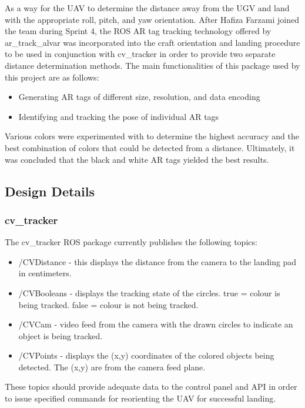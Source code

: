 As a way for the UAV to determine the distance away from the UGV and land with the appropriate roll, pitch, and yaw orientation. After Hafiza Farzami joined the team during Sprint 4, the ROS AR tag tracking technology offered by ar\_track\_alvar was incorporated into the craft orientation and landing procedure to be used in conjunction with cv\_tracker in order to provide two separate distance determination methods. The main functionalities of this package used by this project are as follows:

\begin{itemize}
	\item Generating AR tags of different size, resolution, and data encoding
	\item Identifying and tracking the pose of individual AR tags
\end{itemize}

Various colors were experimented with to determine the highest accuracy and the best combination of colors that could be detected from a distance. Ultimately, it was concluded that the black and white AR tags yielded the best results.

%
%
%


\subsection{Design Details}
\subsubsection{cv\_tracker}
The cv\_tracker ROS package currently publishes the following topics:
\begin{itemize}
	\item  /CVDistance - this displays the distance from the camera to the landing pad in centimeters.
	\item /CVBooleans - displays the tracking state of the circles. true = colour is being tracked. false = colour is not being tracked.
           \item /CVCam - video feed from the camera with the drawn circles to indicate an object is being tracked.
	\item /CVPoints - displays the (x,y) coordinates of the colored objects being detected. The (x,y) are from the camera feed plane.
\end{itemize}
These topics should provide adequate data to the control panel and API in order to issue specified commands for reorienting the UAV for successful landing.


